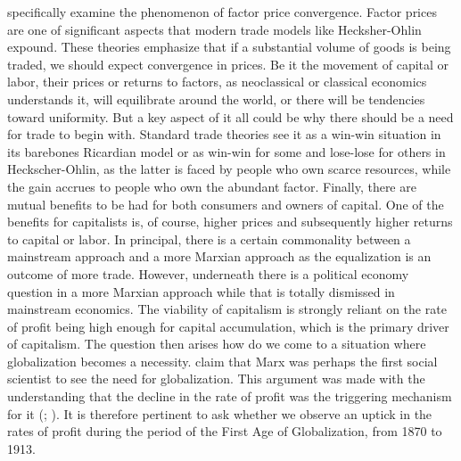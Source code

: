 \documentclass[10pt]{article}
\begin{document}
\par \citet{ORourke2002} specifically examine the phenomenon of factor price convergence. Factor prices are one of significant aspects that modern trade models like Hecksher-Ohlin expound. These theories emphasize that if a substantial volume of goods is being traded, we should expect convergence in prices. Be it the movement of capital or labor, their prices or returns to factors, as neoclassical or classical economics understands it, will equilibrate around the world, or there will be tendencies toward uniformity. But a key aspect of it all could be why there should be a need for trade to begin with. Standard trade theories see it as a win-win situation in its barebones Ricardian model or as win-win for some and lose-lose for others in Heckscher-Ohlin, as the latter is faced by people who own scarce resources, while the gain accrues to people who own the abundant factor. Finally, there are mutual benefits to be had for both consumers and owners of capital. One of the benefits for capitalists is, of course, higher prices and subsequently higher returns to capital or labor. In principal, there is a certain commonality between a mainstream approach and a more Marxian approach as the equalization is an outcome of more trade. However, underneath there is a political economy question in a more Marxian approach while that is totally dismissed in mainstream economics. The viability of capitalism is strongly reliant on the rate of profit being high enough for capital accumulation, which is the primary driver of capitalism. The question then arises how do we come to a situation where globalization becomes a necessity. \citet{JellissenGottheil2009} claim that Marx was perhaps the first social scientist to see the need for globalization. This argument was made with the understanding that the decline in the rate of profit was the triggering mechanism for it (\citet{moseley1997rate}; \citet{moseley2009us}). It is therefore pertinent to ask whether we observe an uptick in the rates of profit during the period of the First Age of Globalization, from 1870 to 1913.

\end{document}
